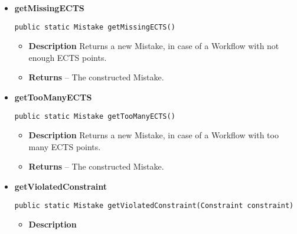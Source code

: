 \documentclass[11pt,a4paper]{report}
\begin{document}
{{{{{{{{{{{{\begin{itemize}
{\begin{itemize}
{							}%
							\item{
								{\bf  Returns} -- The constructed Mistake. 
							}%
						\end{itemize}
					}%
					\item{ 
						\hypertarget{studyplanning.model.mistake.Mistakes.getMissingECTS()}{{\bf  getMissingECTS}\\}
						\begin{lstlisting}[frame=none]
public static Mistake getMissingECTS()
						\end{lstlisting} %
						\begin{itemize}
							\item{
								{\bf  Description}
								Returns a new Mistake, in case of a Workflow with not enough ECTS points.
							}
							\item{
								{\bf  Returns} 
								-- The constructed Mistake. 
							}%
						\end{itemize}
					}%
					\item{ 
						\hypertarget{studyplanning.model.mistake.Mistakes.getTooManyECTS()}{{\bf  getTooManyECTS}\\}
						\begin{lstlisting}[frame=none]
public static Mistake getTooManyECTS()
						\end{lstlisting} %
						\begin{itemize}
							\item{
								{\bf  Description}
								Returns a new Mistake, in case of a Workflow with too many ECTS points.
							}
							\item{
								{\bf  Returns} -- The constructed Mistake. 
							}%
						\end{itemize}
					}%
					\item{ 
						\hypertarget{studyplanning.model.mistake.Mistakes.getViolatedConstraint(studyplanning.model.workflow.constraint.Constraint)}{{\bf  getViolatedConstraint}\\}
						\begin{lstlisting}[frame=none]
public static Mistake getViolatedConstraint(Constraint constraint)
						\end{lstlisting} %
						\begin{itemize}
							\item{
								{\bf  Description}
}
\end{itemize}}
\end{itemize}}}}}}}}}}}}}
\end{document}
